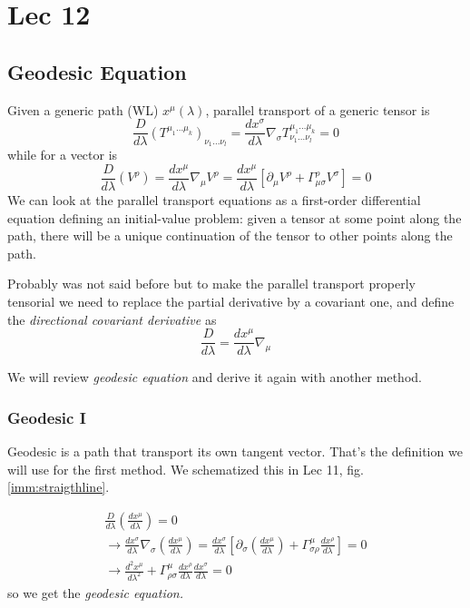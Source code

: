 \section{Lec 12}
\subsection{Geodesic Equation}
Given a generic path (WL) $x^{\mu }\left( \lambda  \right)$, parallel transport of a generic tensor is
\[
\frac{D}{d\lambda } \left( T^{\mu _{1}\ldots \mu _{k}} \right)_{\nu _{1}\ldots \nu _{l}} =\frac{d x^{\sigma }}{d \lambda } \nabla _{\sigma } T^{\mu _{1}\ldots \mu _{k}}_{\nu _{1}\ldots \nu _{l}} = 0		
\]
while for a vector is 
\[
	\frac{D}{d\lambda } \left( V^{\rho } \right) = \frac{d x^{\mu }}{d \lambda } \nabla _{\mu }V^{\rho } = \frac{d x^{\mu }}{d \lambda } \left[ \partial_{\mu }V^{\rho } + \Gamma ^{\rho }_{\mu \sigma  } V^{\sigma } \right]=0
\]
We can look at the parallel transport equations as a first-order differential equation defining an initial-value problem: given a tensor at some point along the path, there will be a unique continuation of the tensor to other points along the path.

Probably was not said before but to make the parallel transport properly tensorial we need to replace the partial derivative by a covariant one, and define the \emph{directional covariant derivative} as
\[
\frac{D}{d\lambda } = \frac{d x^{\mu }}{d \lambda }\nabla _{\mu }
\]

We will review \emph{geodesic equation} and derive it again with another method.

\subsubsection{Geodesic I}
Geodesic is a path that transport its own tangent vector. That's the definition we will use for the first method. We schematized this in Lec 11, fig. \ref{imm:straigthline}.

\begin{gather*}
\frac{D}{d\lambda } \left( \frac{d x^{\mu }}{d \lambda } \right) = 0 \\
\to  \frac{d x^{\sigma }}{d \lambda }\nabla _{\sigma }\left( \frac{d x^{\mu }}{d \lambda } \right) = \frac{d x^{\sigma }}{d \lambda }\left[ \partial_{\sigma } \left( \frac{d x^{\mu }}{d \lambda } \right) + \Gamma ^{\mu }_{\sigma \rho } \frac{d x^{\rho }}{d \lambda } \right] = 0 \\
\to \frac{d ^{2} x^{\mu }}{d \lambda ^{2}} + \Gamma ^{\mu }_{\rho \sigma } \frac{d x^{\rho }}{d \lambda } \frac{d x^{\sigma }}{d \lambda } = 0 
\end{gather*}
so we get the \emph{geodesic equation.}

